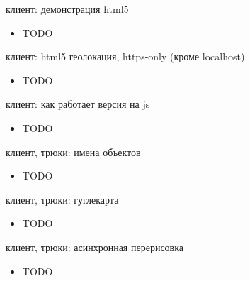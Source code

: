 \documentclass[aspectratio=169,handout,bigger]{beamer}
\begin{document}

\begin{frame}{клиент: демонстрация html5}
  \begin{itemize}
    \item TODO
  \end{itemize}
\end{frame}


\begin{frame}{клиент: html5 геолокация, https-only (кроме localhost)}
  \begin{itemize}
    \item TODO
  \end{itemize}
\end{frame}


\begin{frame}{клиент: как работает версия на js}
  \begin{itemize}
    \item TODO
  \end{itemize}
\end{frame}


\begin{frame}{клиент, трюки: имена объектов}
  \begin{itemize}
    \item TODO
  \end{itemize}
\end{frame}


\begin{frame}{клиент, трюки: гуглекарта}
  \begin{itemize}
    \item TODO
  \end{itemize}
\end{frame}


\begin{frame}{клиент, трюки: асинхронная перерисовка}
  \begin{itemize}
    \item TODO
  \end{itemize}
\end{frame}
\end{document}
